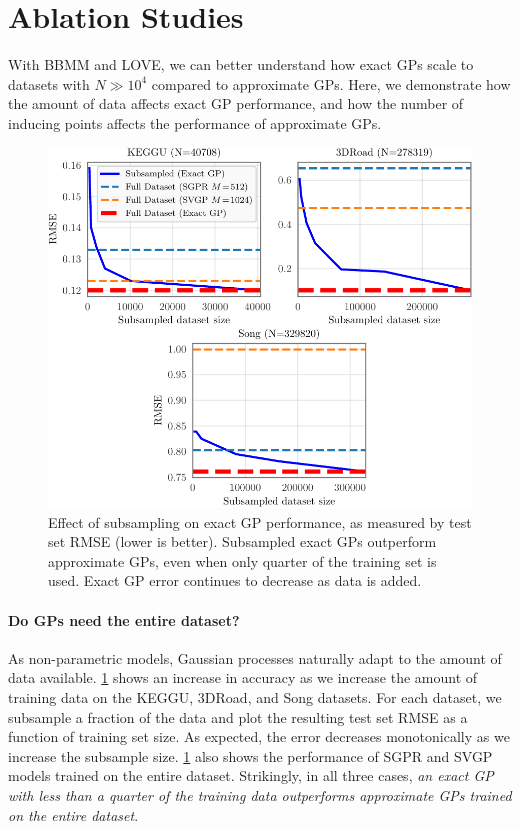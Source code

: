\section{Ablation Studies}
With BBMM and LOVE, we can better understand how exact GPs scale to datasets with $N\gg 10^4$ compared to approximate GPs.
Here, we demonstrate how the amount of data affects exact GP performance, and how the number of inducing points affects the performance of approximate GPs.

\begin{figure}[t!]
  \centering
  \includegraphics[width=0.7\linewidth]{figures/subsampling.pdf}
  \caption[Effect of subsampling on exact GP performance.]{
    Effect of subsampling on exact GP performance, as measured by test set RMSE (lower is better).
    Subsampled exact GPs outperform approximate GPs, even when only quarter of the training set is used.
    Exact GP error continues to decrease as data is added.
  }
  \label{fig:subsampling_results}
\end{figure}

\paragraph{Do GPs need the entire dataset?}
As non-parametric models, Gaussian processes naturally adapt to the amount of data available.
\cref{fig:subsampling_results} shows an increase in accuracy as we increase the amount of training data on the KEGGU, 3DRoad, and Song datasets.
For each dataset, we subsample a fraction of the data and plot the resulting test set RMSE as a function of training set size.
As expected, the error decreases monotonically as we increase the subsample size.
\cref{fig:subsampling_results} also shows the performance of SGPR and SVGP models trained on the entire dataset.
Strikingly, in all three cases, \textit{an exact GP with less than a quarter of the training data outperforms approximate GPs trained on the entire dataset}.

